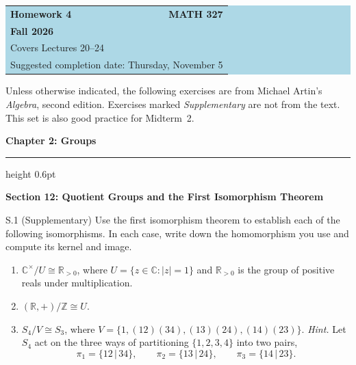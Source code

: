 \documentclass[11pt]{article}
\newcommand{\Z}{\mathbb{Z}}
\newcommand{\R}{\mathbb{R}}
\newcommand{\C}{\mathbb{C}}
\newcommand{\chapterheading}[1]{%
  \par\Needspace{12\baselineskip}\vspace{0.5em}
  {\color{courseblue}\Large\bfseries #1}\par\vspace{0.35em}
  {\color{boxborder}\hrule height 0.6pt}\vspace{0.35em}
}
\newcommand{\sectionheading}[1]{%
  \Needspace{8\baselineskip}
  \vspace{0.25em}
  {\color{darkgray}\large\bfseries #1}\par
}
\begin{document}
\begin{center}
  \colorbox{lightblue}{%
    \begin{minipage}{0.92\textwidth}
      \vspace{0.6em}
      \begin{tabular*}{\textwidth}{@{\extracolsep{\fill}}lr}
        {\color{courseblue}\bfseries\LARGE Homework 4} &
        {\color{courseblue}\bfseries\LARGE MATH 327}\\[0.4em]
        \multicolumn{2}{l}{\color{darkgray}\bfseries Fall 2026}\\[0.35em]
        \multicolumn{2}{l}{\color{darkgray}Covers Lectures 20--24}\\[0.2em]
        \multicolumn{2}{l}{\color{darkgray}Suggested completion date: Thursday, November 5}
      \end{tabular*}
      \vspace{0.5em}
    \end{minipage}}
\end{center}

\vspace{0.5em}

Unless otherwise indicated, the following exercises are from Michael Artin's
\emph{Algebra}, second edition. Exercises marked \emph{Supplementary} are
not from the text. This set is also good practice for Midterm~2.


\chapterheading{Chapter 2: Groups}

\sectionheading{Section 12: Quotient Groups and the First Isomorphism Theorem}

\begin{exercise}{S.1 (Supplementary)}
Use the first isomorphism theorem to establish each of the following
isomorphisms. In each case, write down the homomorphism you use and
compute its kernel and image.
\begin{enumerate}[label=\textbf{(\alph*)}]
  \item $\C^{\times}/U\cong\R_{>0}$, where $U=\{z\in\C:|z|=1\}$ and
        $\R_{>0}$ is the group of positive reals under multiplication.
  \item $(\R,+)/\Z\cong U$.
  \item $S_4/V\cong S_3$, where $V=\{1,(12)(34),(13)(24),(14)(23)\}$.
        \textit{Hint.} Let $S_4$ act on the three ways of partitioning
        $\{1,2,3,4\}$ into two pairs,
        \[
          \pi_1=\{12\,|\,34\},\qquad
          \pi_2=\{13\,|\,24\},\qquad
          \pi_3=\{14\,|\,23\}.
        \]
\end{enumerate}
\end{exercise}
\end{document}
